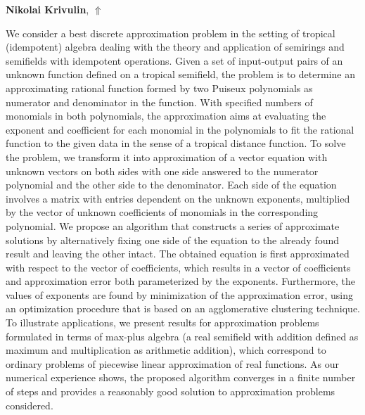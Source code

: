 \documentclass[ILAS2025-program.tex]{subfiles}
\begin{document}
\hypertarget{down0420}{}\begin{ilasabstract}
    
\textbf{Nikolai Krivulin},  \hfill \hyperlink{up0420}{$\Uparrow$}
    
    
\mtskip
    We consider a best discrete approximation problem in the setting of tropical (idempotent) algebra dealing with the theory and application of semirings and semifields with idempotent operations. Given a set of input-output pairs of an unknown function defined on a tropical semifield, the problem is to determine an approximating rational function formed by two Puiseux polynomials as numerator and denominator in the function. With specified numbers of monomials in both polynomials, the approximation aims at evaluating the exponent and coefficient for each monomial in the polynomials to fit the rational function to the given data in the sense of a tropical distance function. To solve the problem, we transform it into approximation of a vector equation with unknown vectors on both sides with one side answered to the numerator polynomial and the other side to the denominator. Each side of the equation involves a matrix with entries dependent on the unknown exponents, multiplied by the vector of unknown coefficients of monomials in the corresponding polynomial. We propose an algorithm that constructs a series of approximate solutions by alternatively fixing one side of the equation to the already found result and leaving the other intact. The obtained equation is first approximated with respect to the vector of coefficients, which results in a vector of coefficients and approximation error both parameterized by the exponents. Furthermore, the values of exponents are found by minimization of the approximation error, using an optimization procedure that is based on an agglomerative clustering technique. To illustrate applications, we present results for approximation problems formulated in terms of max-plus algebra (a real semifield with addition defined as maximum and multiplication as arithmetic addition), which correspond to ordinary problems of piecewise linear approximation of real functions. As our numerical experience shows, the proposed algorithm converges in a finite number of steps and provides a reasonably good solution to approximation problems considered.   

\end{ilasabstract}
    
\end{document}
